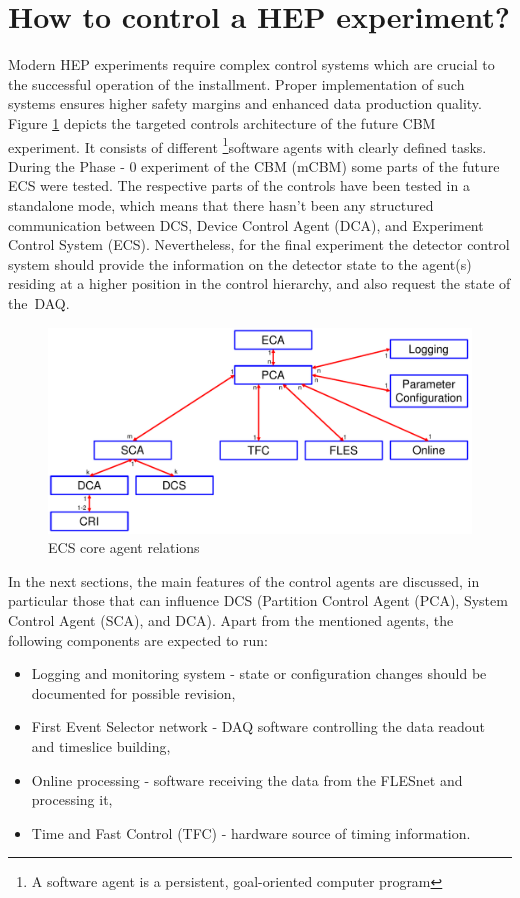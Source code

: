 \section{How to control a HEP experiment?}

Modern \gls{HEP} experiments require complex control systems which are crucial to the successful operation of the installment. Proper implementation of such systems ensures higher safety margins and enhanced data production quality. 
Figure \ref{fig_sim} depicts the targeted controls architecture of the future \gls{CBM} experiment. It consists of different \footnote{A software agent is a persistent, goal-oriented computer program}{software agents} with clearly defined tasks. During the Phase - 0 experiment of the \gls{CBM} (\gls{mCBM}) some parts of the future \gls{ECS} were tested. The respective parts of the controls have been tested in a standalone mode, which means that there hasn't been any structured communication between \gls{DCS}, Device Control Agent (\gls{DCA}), and Experiment Control System (\gls{ECS}). Nevertheless, for the final experiment the detector control system should provide the information on the detector state to the agent(s) residing at a higher position in the control hierarchy, and also request the state of the~\gls{DAQ}.
\begin{figure}[!h]
\centering
\includegraphics[width=0.8\columnwidth]{Chapter3/Controls/images/AgentsRelations_V2.pdf}
\caption{\gls{ECS} core agent relations}
\label{fig_sim}
\end{figure}

 In the next sections, the main features of the control agents are discussed, in particular those that can influence \gls{DCS} (Partition Control Agent (\gls{PCA}), System Control Agent (\gls{SCA}), and \gls{DCA}). Apart from the mentioned agents, the following components are expected to run: 
 \begin{itemize}
     \item Logging and monitoring system - state or configuration changes should be documented for possible revision,
     \item First Event Selector network - \gls{DAQ} software controlling the data readout and timeslice building,
     \item Online processing - software receiving the data from the FLESnet and processing it,
     \item Time and Fast Control (\gls{TFC}) - hardware source of timing information.
 \end{itemize}
